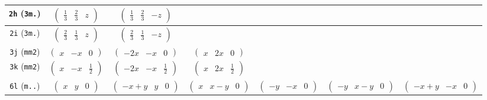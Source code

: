 \documentclass[fleqn,9pt,landscape]{jsarticle}
\begin{document}
\begin{center}
\begin{longtable}{ccccccc}
{\tt 2h} ({\tt 3m.}) & $ \begin{pmatrix} \frac{1}{3} & \frac{2}{3} & z \end{pmatrix} $ & $ \begin{pmatrix} \frac{1}{3} & \frac{2}{3} & - z \end{pmatrix} $ & $  $ & $  $ & $  $ & $  $ \\ \hline
{\tt 2i} ({\tt 3m.}) & $ \begin{pmatrix} \frac{2}{3} & \frac{1}{3} & z \end{pmatrix} $ & $ \begin{pmatrix} \frac{2}{3} & \frac{1}{3} & - z \end{pmatrix} $ & $  $ & $  $ & $  $ & $  $ \\ \hline
{\tt 3j} ({\tt mm2}) & $ \begin{pmatrix} x & - x & 0 \end{pmatrix} $ & $ \begin{pmatrix} - 2 x & - x & 0 \end{pmatrix} $ & $ \begin{pmatrix} x & 2 x & 0 \end{pmatrix} $ & $  $ & $  $ & $  $ \\ \hline
{\tt 3k} ({\tt mm2}) & $ \begin{pmatrix} x & - x & \frac{1}{2} \end{pmatrix} $ & $ \begin{pmatrix} - 2 x & - x & \frac{1}{2} \end{pmatrix} $ & $ \begin{pmatrix} x & 2 x & \frac{1}{2} \end{pmatrix} $ & $  $ & $  $ & $  $ \\ \hline
{\tt 6l} ({\tt m..}) & $ \begin{pmatrix} x & y & 0 \end{pmatrix} $ & $ \begin{pmatrix} - x + y & y & 0 \end{pmatrix} $ & $ \begin{pmatrix} x & x - y & 0 \end{pmatrix} $ & $ \begin{pmatrix} - y & - x & 0 \end{pmatrix} $ & $ \begin{pmatrix} - y & x - y & 0 \end{pmatrix} $ & $ \begin{pmatrix} - x + y & - x & 0 \end{pmatrix} $ \\ \hline

\end{longtable}
\end{center}
\end{document}
